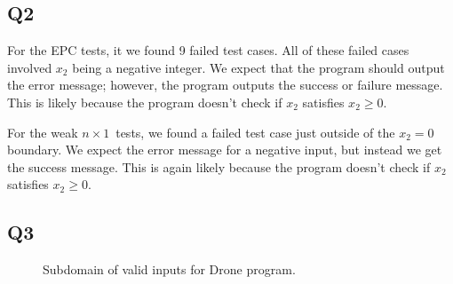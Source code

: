 \documentclass[12pt, letterpaper, titlepage]{article}
\newcommand{\nx}{$n\times1$}
\begin{document}
\subsection*{Q2}
For the EPC tests, it we found 9 failed test cases. All of these failed cases involved $x_2$ being a negative integer. We expect that the program should output the error message; however, the program outputs the success or failure message. This is likely because the program doesn't check if $x_2$ satisfies $x_2\geq0$.

For the weak \nx\ tests, we found a failed test case just outside of the $x_2=0$ boundary. We expect the error message for a negative input, but instead we get the success message. This is again likely because the program doesn't check if $x_2$ satisfies $x_2\geq0$.

\subsection*{Q3}
\begin{figure}[H]
\centering
\caption{Subdomain of valid inputs for Drone program.}
\end{figure}
\end{document}
